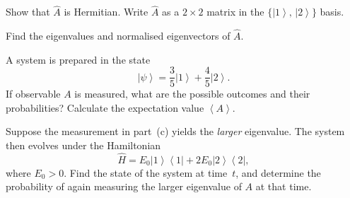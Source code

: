 \documentclass[12pt,a4paper]{article}
\renewcommand{\ket}[1]{\left|#1\right\rangle}
\renewcommand{\ketbra}[2]{\left|#1\right\rangle\!\left\langle #2\right|}
\renewcommand{\expect}[1]{\left\langle #1\right\rangle}
\begin{document}
\begin{parts}
\item Show that $\hat{A}$ is Hermitian. Write $\hat{A}$ as a $2\times 2$ matrix in the $\{\ket{1},\,\ket{2}\}$ basis. 

\item Find the eigenvalues and normalised eigenvectors of $\hat{A}$. 

\item A system is prepared in the state
\[
\ket{\psi} = \frac{3}{5}\ket{1} + \frac{4}{5}\ket{2}.
\]
If observable $A$ is measured, what are the possible outcomes and their probabilities? Calculate the expectation value $\expect{A}$. 

\item Suppose the measurement in part~(c) yields the \emph{larger} eigenvalue. The system then evolves under the Hamiltonian
\[
\hat{H} = E_0\ketbra{1}{1} + 2E_0\ketbra{2}{2},
\]
where $E_0 > 0$. Find the state of the system at time~$t$, and determine the probability of again measuring the larger eigenvalue of $A$ at that time. 
\end{parts}

\newpage


\end{document}
